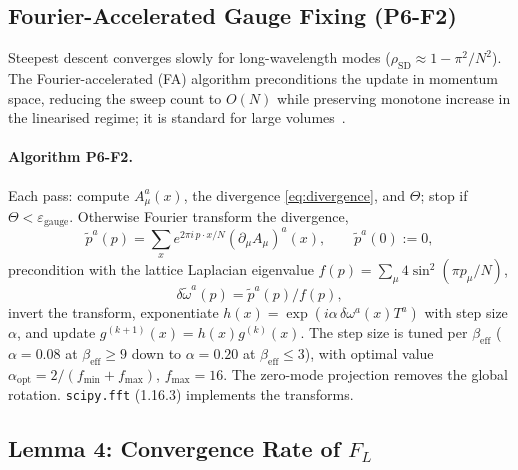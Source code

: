 \documentclass[11pt,a4paper]{article}
\theoremstyle{plain}
\theoremstyle{definition}
\theoremstyle{remark}
\newcommand{\be}{\beta_{\mathrm{eff}}}
\newcommand{\epsg}{\varepsilon_{\mathrm{gauge}}}
\newcommand{\FL}{F_{L}}
\newcommand{\Lcond}{\partial_{\mu}A_{\mu}}
\begin{document}
\subsection{Fourier-Accelerated Gauge Fixing (P6-F2)}
\label{ssec:FA}

Steepest descent converges slowly for long-wavelength modes
($\rho_{\mathrm{SD}}\approx1-\pi^2/N^2$). The Fourier-accelerated (FA)
algorithm preconditions the update in momentum space, reducing the
sweep count to $O(N)$ while preserving monotone increase in the
linearised regime; it is standard for large volumes~\cite{CM}.

\paragraph{Algorithm P6-F2.}
Each pass: compute $A^a_\mu(x)$, the divergence \eqref{eq:divergence},
and $\Theta$; stop if $\Theta<\epsg$. Otherwise Fourier transform the
divergence,
\begin{equation}
  \tilde p^{a}(p)=\sum_{x}e^{2\pi i\,p\cdot x/N}(\Lcond)^{a}(x),\qquad
  \tilde p^{a}(0):=0,
  \label{eq:fft}
\end{equation}
precondition with the lattice Laplacian eigenvalue
$f(p)=\sum_\mu 4\sin^2(\pi p_\mu/N)$,
\begin{equation}
  \delta\tilde\omega^{a}(p)=\tilde p^{a}(p)/f(p),
  \label{eq:precond}
\end{equation}
invert the transform, exponentiate
$h(x)=\exp(i\alpha\,\delta\omega^a(x)T^a)$ with step size $\alpha$, and
update $g^{(k+1)}(x)=h(x)g^{(k)}(x)$. The step size is tuned per
$\be$ ($\alpha=0.08$ at $\be\ge9$ down to $\alpha=0.20$ at
$\be\le3$), with optimal value $\alpha_{\mathrm{opt}}=2/(f_{\min}+f_{\max})$,
$f_{\max}=16$. The zero-mode projection removes the global rotation.
\texttt{scipy.fft} (1.16.3) implements the transforms.

\subsection{Lemma 4: Convergence Rate of \texorpdfstring{$\FL$}{F\_L}}
\label{ssec:lemma4}
\end{document}
